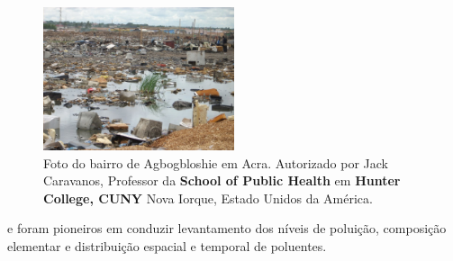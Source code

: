 \begin{figure}[H]
  \centering
  \includegraphics[width=0.5\textwidth]{../inputs/images/ewaste_jack_caravano.jpg}
  \caption{Foto do bairro de Agbogbloshie em Acra. Autorizado por Jack Caravanos, 
           Professor da \textbf{School of Public Health} em \textbf{Hunter College, CUNY}
           Nova Iorque, Estado Unidos da América. \label{fig:ewaste}}
\end{figure}

\citep{ARKU2008} e \citep{DIONISIO2010} foram pioneiros em conduzir  
levantamento dos níveis de poluição, composição elementar e distribuição espacial 
e temporal de poluentes.






